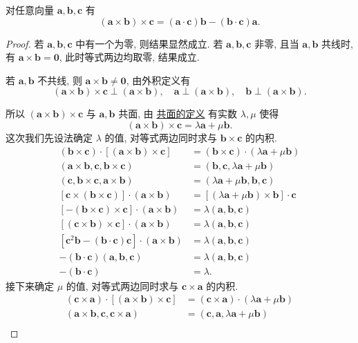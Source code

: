 \documentclass[cn,toc=twocol]{elegantbook}
\newcommand{\ve}[1]{\boldsymbol{#1}}
\newcommand{\vtimes}[2]{\ve{#1} \times \ve{#2}}
\begin{document}
\begin{theorem}
	对任意向量 $\ve a, \ve b, \ve c$ 有
	\[
		(\vtimes ab) \times \ve c = (\ve a \cdot \ve c)\ve {b} - (\ve b \cdot \ve c) \ve a.
	\]
\end{theorem}

\begin{proof}
	若 $\ve a, \ve b, \ve c$ 中有一个为零, 则结果显然成立. 若 $\ve a, \ve b, \ve c$ 非零, 且当 $\ve a, \ve b$ 共线时, 有 $\vtimes ab = \ve 0$, 此时等式两边均取零, 结果成立.
	
	若 $\ve a, \ve b$ 不共线, 则 $\vtimes ab \neq \ve 0$, 由外积定义有
	\[
		(\vtimes ab) \times \ve c \perp (\vtimes ab), \quad \ve a \perp (\ve a \times \ve b),  \quad\ve b \perp (\vtimes ab).
	\]
	
	所以 $(\vtimes ab) \times \ve c$ 与 $\ve a, \ve b$ 共面, 由 \hyperref[def:coplanarity]{共面的定义} 有实数 $\lambda, \mu$ 使得
	\[
		(\vtimes ab)\times \ve c = \lambda \ve a + \mu \ve b.
	\]
	这次我们先设法确定 $\lambda$ 的值, 对等式两边同时求与 $\vtimes bc$ 的内积.
	\[
	\begin{aligned}
		(\vtimes bc) \cdot [(\vtimes ab)\times \ve c] &= (\vtimes bc) \cdot (\lambda \ve a + \mu \ve b)\\
		(\vtimes ab, \ve c, \vtimes bc) &= (\ve b, \ve c, \lambda \ve a + \mu \ve b)\\
		(\ve c, \vtimes bc, \vtimes ab) &= (\lambda \ve a + \mu \ve b, \ve b, \ve c)\\
		[\ve c \times (\vtimes bc)] \cdot (\vtimes ab) &= [(\lambda \ve a + \mu \ve b) \times \ve b] \cdot \ve c\\
		[- (\vtimes bc) \times \ve c] \cdot (\vtimes ab) &= \lambda (\ve a,\ve b, \ve c)\\
		[(\vtimes cb) \times \ve c] \cdot (\vtimes ab) &= \lambda (\ve a,\ve b, \ve c)\\
		[\ve c^2 \ve b - (\ve b \cdot \ve c) \ve c] \cdot (\vtimes ab) &= \lambda (\ve a,\ve b, \ve c)\\
		-(\ve b \cdot \ve c) (\ve a,\ve b, \ve c) &= \lambda (\ve a,\ve b, \ve c)\\
		-(\ve b \cdot \ve c) &= \lambda.
	\end{aligned}
	\]
	接下来确定 $\mu$ 的值, 对等式两边同时求与 $\vtimes ca$ 的内积.
	\[
	\begin{aligned}
		(\vtimes ca) \cdot [(\vtimes ab)\times \ve c] &= (\vtimes ca) \cdot (\lambda \ve a + \mu \ve b)\\
		(\vtimes ab, \ve c, \vtimes ca) &= (\ve c, \ve a, \lambda \ve a + \mu \ve b)\\

\end{aligned}\]
\end{proof}
\end{document}
